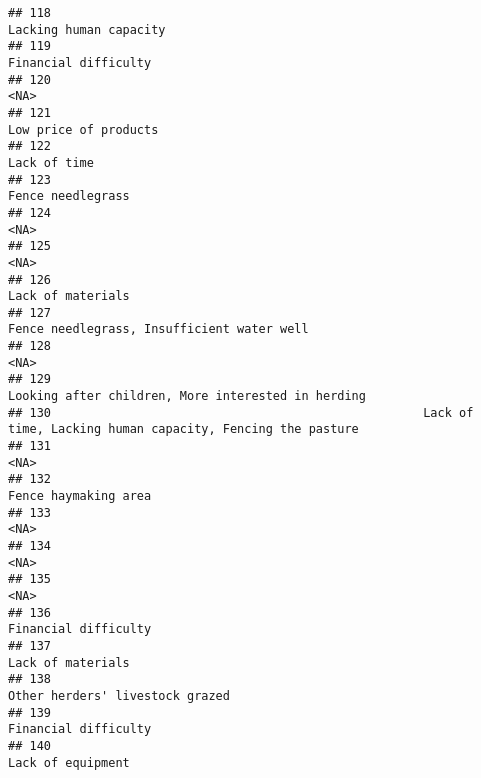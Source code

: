\documentclass[
]{article}
\begin{document}
\begin{verbatim}
## 118                                                                                       Lacking human capacity
## 119                                                                                         Financial difficulty
## 120                                                                                                         <NA>
## 121                                                                                        Low price of products
## 122                                                                                                 Lack of time
## 123                                                                                            Fence needlegrass
## 124                                                                                                         <NA>
## 125                                                                                                         <NA>
## 126                                                                                            Lack of materials
## 127                                                                   Fence needlegrass, Insufficient water well
## 128                                                                                                         <NA>
## 129                                                           Looking after children, More interested in herding
## 130                                                    Lack of time, Lacking human capacity, Fencing the pasture
## 131                                                                                                         <NA>
## 132                                                                                         Fence haymaking area
## 133                                                                                                         <NA>
## 134                                                                                                         <NA>
## 135                                                                                                         <NA>
## 136                                                                                         Financial difficulty
## 137                                                                                            Lack of materials
## 138                                                                              Other herders' livestock grazed
## 139                                                                                         Financial difficulty
## 140                                                                                            Lack of equipment

\end{verbatim}
\end{document}
